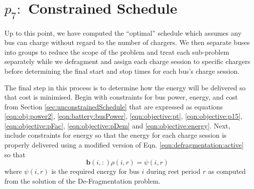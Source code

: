 \section{$p_7:$ Constrained Schedule\label{sec:constrainedSchedule}}
Up to this point, we have computed the ``optimal'' schedule which assumes any bus can charge without regard to the number of chargers. We then separate buses into groups to reduce the scope of the problem and treat each sub-problem separately while we defragment and assign each charge session to specific chargers before determining the final start and stop times for each bus's charge session.
\par The final step in this process is to determine how the energy will be delivered so that cost is minimised. Begin with constraints for bus power, energy, and cost from Section \ref{sec:unconstrainedSchedule} that are expressed as equations \eqref{eqn:obj:power2}, \eqref{eqn:battery:busPower}, \eqref{eqn:objective:pt}, \eqref{eqn:objective:p15}, \eqref{eqn:objective:pFac}, \eqref{eqn:objective:pDem} and \eqref{eqn:objective:energy}. Next, include constraints for energy so that the energy for each charge session is properly delivered using a modified version of Eqn. \eqref{eqn:defragmentation:active} so that
\begin{equation}\label{eqn:constrainedSchedule:modified}
	\mathbf{b}(i,:)\rho(i,r) = \psi(i,r)
\end{equation}
where $\psi(i,r)$ is the required energy for bus $i$ during rest period $r$ as computed from the solution of the De-Fragmentation problem.
\\[0.1in] 
